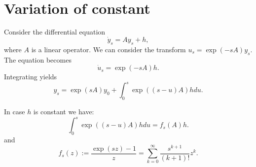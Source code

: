 \documentclass[12pt]{article}
\theoremstyle{remark}
\begin{document}
\section{Variation of constant}

Consider the differential equation 
\[
   \dot{y}_s = A y_s + h,
\]
where \(A\) is a linear operator. 
We can consider the transform \(u_s = \exp(-sA) y_s\).
The equation becomes
\[
   \dot{u}_s = \exp(-sA) h.
\]
Integrating yields 
\[
   y_s = \exp(sA) y_0 + \int_0^s \exp((s - u)A) h du.
\]

In case \(h\) is constant we have:
\[
   \int_0^s \exp((s - u)A) h du = f_s(A)h.
\]
and 
\[
   f_s(z) := \frac{\exp(sz) - 1}{z} = \sum_{k=0}^\infty \frac{s^{k+1}}{(k+1)!} z^{k}.
\]
\end{document}
